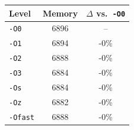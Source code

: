 \begin{tabular*}{\columnwidth}{@{\extracolsep\fill}lcc@{\extracolsep\fill}}
\toprule
\textbf{Level} & \textbf{Memory} & \textbf{$\Delta$ vs.\ \texttt{-O0}} \\
\midrule
\texttt{-O0} & 6896 & -- \\
\texttt{-O1} & 6894 & -0\% \\
\texttt{-O2} & 6888 & -0\% \\
\texttt{-O3} & 6884 & -0\% \\
\texttt{-Os} & 6884 & -0\% \\
\texttt{-Oz} & 6882 & -0\% \\
\texttt{-Ofast} & 6888 & -0\% \\
\bottomrule
\end{tabular*}
